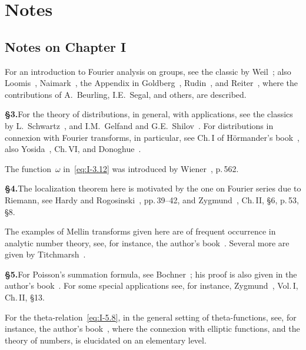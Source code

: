 \chapter*{Notes}
\label{ch:notes}

\section*{Notes on Chapter I}

\noindent For an introduction to Fourier analysis on groups, see the classic by Weil~\cite{weil1940}; also Loomis~\cite{loomis1953}, Naimark~\cite{naimark1964}, the Appendix in Goldberg~\cite{goldberg1961}, Rudin~\cite{rudin1962}, and Reiter~\cite{reiter1968}, where the contributions of A.~Beurling, I.E.~Segal, and others, are described.

\noindent\textbf{§3.}\quad For the theory of distributions, in general, with applications, see the classics by L.~Schwartz~\cite{schwartz1950}, and I.M.~Gelfand and G.E.~Shilov~\cite{gelfandshilov1964}. For distributions in connexion with Fourier transforms, in particular, see Ch.\,I of H{\"o}rmander's book~\cite{hormander1963}, also Yosida~\cite{yosida1965}, Ch.\,VI, and Donoghue~\cite{donoghue1969}.

\noindent The function~$\omega$ in~\eqref{eq:I-3.12} was introduced by Wiener~\cite{wiener1926}, p.\,562.

\noindent\textbf{§4.}\quad The localization theorem here is motivated by the one on Fourier series due to Riemann, see Hardy and Rogosinski~\cite{hardyrogo1944}, pp.\,39--42, and Zygmund~\cite{zygmund1959}, Ch.\,II, §6, p.\,53, §8.

\noindent The examples of Mellin transforms given here are of frequent occurrence in analytic number theory, see, for instance, the author's book~\cite{chandrasekharan1970}. Several more are given by Titchmarsh~\cite{titchmarsh1937}.

\noindent\textbf{§5.}\quad For Poisson's summation formula, see Bochner~\cite{bochner1932}; his proof is also given in the author's book~\cite{chandrasekharan1970}. For some special applications see, for instance, Zygmund~\cite{zygmund1959}, Vol.\,I, Ch.\,II, §13.

\noindent For the theta-relation~\eqref{eq:I-5.8}, in the general setting of theta-functions, see, for instance, the author's book~\cite{chandrasekharan1985}, where the connexion with elliptic functions, and the theory of numbers, is elucidated on an elementary level.

